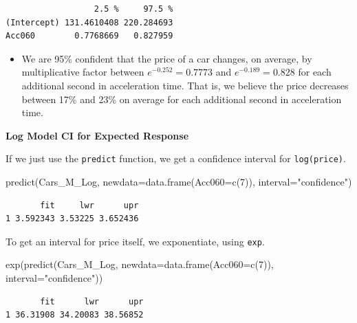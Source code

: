 \documentclass[
  letterpaper,
  DIV=11,
  numbers=noendperiod]{scrreprt}
\newenvironment{Shaded}{\begin{snugshade}}{\end{snugshade}}
\newcommand{\AttributeTok}[1]{\textcolor[rgb]{0.40,0.45,0.13}{#1}}
\newcommand{\DecValTok}[1]{\textcolor[rgb]{0.68,0.00,0.00}{#1}}
\newcommand{\FunctionTok}[1]{\textcolor[rgb]{0.28,0.35,0.67}{#1}}
\newcommand{\NormalTok}[1]{\textcolor[rgb]{0.00,0.23,0.31}{#1}}
\newcommand{\StringTok}[1]{\textcolor[rgb]{0.13,0.47,0.30}{#1}}
\providecommand{\tightlist}{%
  \setlength{\itemsep}{0pt}\setlength{\parskip}{0pt}}\usepackage{longtable,booktabs,array}
\begin{document}
\begin{verbatim}
                  2.5 %     97.5 %
(Intercept) 131.4610408 220.284693
Acc060        0.7768669   0.827959
\end{verbatim}

\begin{itemize}
\tightlist
\item
  We are 95\% confident that the price of a car changes, on average, by
  multiplicative factor between \(e^{-0.252} = 0.7773\) and
  \(e^{-0.189}=0.828\) for each additional second in acceleration time.
  That is, we believe the price decreases between 17\% and 23\% on
  average for each additional second in acceleration time.
\end{itemize}

\textbf{Log Model CI for Expected Response}

If we just use the \texttt{predict} function, we get a confidence
interval for \texttt{log(price)}.

\begin{Shaded}
\begin{Highlighting}[]
\FunctionTok{predict}\NormalTok{(Cars\_M\_Log, }\AttributeTok{newdata=}\FunctionTok{data.frame}\NormalTok{(}\AttributeTok{Acc060=}\FunctionTok{c}\NormalTok{(}\DecValTok{7}\NormalTok{)), }\AttributeTok{interval=}\StringTok{"confidence"}\NormalTok{)}
\end{Highlighting}
\end{Shaded}

\begin{verbatim}
       fit     lwr      upr
1 3.592343 3.53225 3.652436
\end{verbatim}

To get an interval for price itself, we exponentiate, using
\texttt{exp}.

\begin{Shaded}
\begin{Highlighting}[]
\FunctionTok{exp}\NormalTok{(}\FunctionTok{predict}\NormalTok{(Cars\_M\_Log, }\AttributeTok{newdata=}\FunctionTok{data.frame}\NormalTok{(}\AttributeTok{Acc060=}\FunctionTok{c}\NormalTok{(}\DecValTok{7}\NormalTok{)), }\AttributeTok{interval=}\StringTok{"confidence"}\NormalTok{))}
\end{Highlighting}
\end{Shaded}

\begin{verbatim}
       fit      lwr      upr
1 36.31908 34.20083 38.56852
\end{verbatim}
\end{document}
